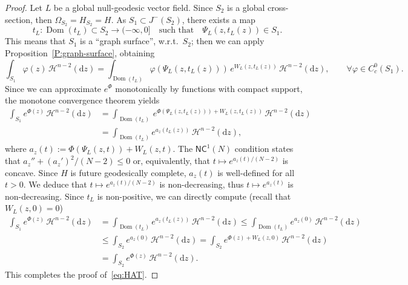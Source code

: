 \documentclass[12pt,a4paper]{amsart}
\theoremstyle{plain}
\theoremstyle{definition}
\numberwithin{equation}{section}
\let\phi\varphi
\DeclareMathOperator{\Dom}{Dom}
\DeclareMathOperator{\dom}{Dom}
\newcommand{\de}{{\mathrm{d}}}
\newcommand{\NC}{\mathsf{NC}}
\newcommand{\haus}{\mathcal{H}}
\newcommand{\gflow}{\Psi}
\begin{document}
\begin{proof}
  Let $L$ be a global null-geodesic vector field.
  Since $S_2$ is a global cross-section, then
  $\Omega_{S_2}=H_{S_2}=H$.
  As $S_1\subset J^{-}(S_2)$, there exists a map
  $$t_L:\dom (t_L)\subset S_2\to(-\infty,0] \quad \text{such
  that} \quad \gflow_L(z,t_L(z))\in S_1.$$
  This means that $S_1$ is a ``graph surface'', w.r.t.\ $S_2$; then
  we can apply Proposition~\ref{P:graph-surface}, obtaining
  \begin{equation}
        \int_{S_1}
    \phi(z)
    \,
    \haus^{n-2}(\de z)
    =
    \int_{\Dom(t_L)}
    \phi(\gflow_L(z,t_L(z)))
    \,
    e^{W_{L}(z,t_L(z))}
    \,
    \haus^{n-2}(\de z)
    ,
    \qquad
    \forall
    \phi\in C_c^0(S_1)
    .
  \end{equation}
  Since we can approximate $e^{\Phi}$ monotonically by functions
  with compact support, the monotone convergence theorem yields
  \begin{align*}
        \int_{S_1}
    e^{\Phi(z)}
    \,
    \haus^{n-2}(\de z)
    &
    =
    \int_{\Dom(t_L)}
    \,
    e^{\Phi(\gflow_L(z,t_L(z)))
      +W_{L}(z,t_L(z))}
    \,
      \haus^{n-2}(\de z)
      \\
      &
    =
    \int_{\Dom(t_L)}
    e^{a_z(t_L(z))}
    \,
    \haus^{n-2}(\de z)
    ,
  \end{align*}
  where $a_{z}(t):= \Phi(\gflow_L(z,t)) +W_{L}(z,t)$.
  The $\NC^1(N)$ condition states that  $a_z''+(a_z')^2/(N-2)\leq 0$ or, equivalently, that $t\mapsto e^{a_z(t)/(N-2)}$ is concave.
  Since $H$ is future geodesically complete,  $a_z(t)$ is well-defined for all $t>0$.
  We deduce that $t\mapsto e^{a_z(t)/(N-2)}$ is non-decreasing, thus $t\mapsto e^{a_z(t)}$ is
  non-decreasing.
  Since $t_L$ is non-positive, we can directly compute (recall that
  $W_L(z,0)=0$)
  \begin{align*}
        \int_{S_1}
    e^{\Phi(z)}
    \,
    \haus^{n-2}(\de z)
    &
      =
    \int_{\Dom(t_L)}
    e^{a_z(t_L(z))}
    \,
      \haus^{n-2}(\de z)
      \leq
    \int_{\Dom(t_L)}
    e^{a_z(0)}
    \,
      \haus^{n-2}(\de z)
    \\
    &
      \leq
    \int_{S_2}
    e^{a_z(0)}
    \,
      \haus^{n-2}(\de z)
      =
    \int_{S_2}
    e^{\Phi(z)+W_L(z,0)}
    \,
      \haus^{n-2}(\de z)
    \\
    &
      =
    \int_{S_2}
    e^{\Phi(z)}
    \,
      \haus^{n-2}(\de z)
      .
  \end{align*}
  This completes the proof of~\eqref{eq:HAT}.


\end{proof}
\end{document}
